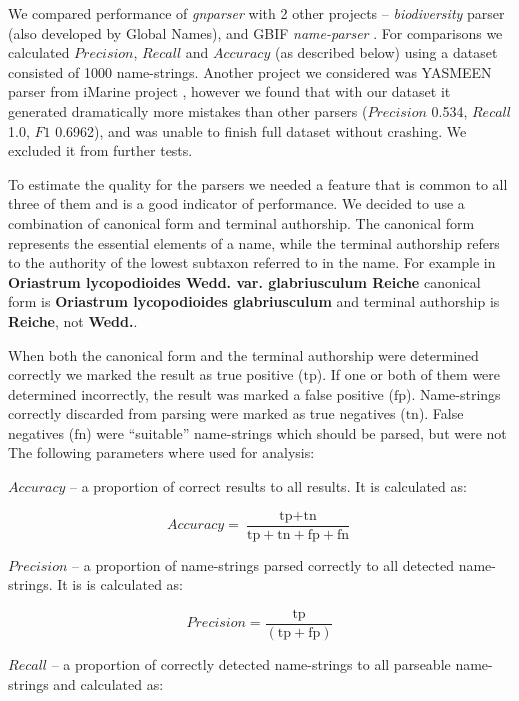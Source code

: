 \documentclass{bmcart}
\begin{document}
We compared performance of \textit{gnparser} with 2 other projects --
\textit{biodiversity} parser \cite{Boyle2013, biodiversity} (also developed by
Global Names), and GBIF \textit{name-parser} \cite{gbifNameParser}. For
comparisons we calculated $Precision$, $Recall$ and $Accuracy$ (as described
below) using a dataset consisted of 1000 name-strings. Another project we
considered was YASMEEN parser from iMarine project \cite{VandenBerghe2015},
however we found that with our dataset it generated dramatically more mistakes
than other parsers ($Precision$ 0.534, $Recall$ 1.0, $F1$ 0.6962), and was
unable to finish full dataset without crashing. We excluded it from further
tests.


To estimate the quality for the parsers we needed a feature that is common to
all three of them and is a good indicator of performance.  We decided to use a
combination of canonical form and terminal authorship.  The canonical form
represents the essential elements of a name, while the terminal authorship
refers to the authority of the lowest subtaxon  referred to in the name. For
example in \textbf{Oriastrum lycopodioides Wedd.  var.  glabriusculum Reiche}
canonical form is \textbf{Oriastrum lycopodioides glabriusculum} and terminal
authorship is \textbf{Reiche}, not \textbf{Wedd.}.

When both the canonical form and the terminal authorship were determined
correctly we marked the result as true positive ($\text{tp}$).  If one or both
of them were determined incorrectly, the result was marked a false positive
($\text{fp}$). Name-strings correctly discarded from parsing were marked as
true negatives ($\text{tn}$). False negatives ($\text{fn}$) were ``suitable''
name-strings which should be parsed, but were not The
following parameters where used for analysis:

$Accuracy$ -- a proportion of correct results to all results.  It is calculated
as:

\[Accuracy = \dfrac{\text{tp} + \text{tn}} {\text{tp} + \text{tn} + \text{fp} + \text{fn}}\]

$Precision$ -- a proportion of name-strings parsed correctly to all detected
name-strings. It is is calculated as:

\[Precision = \dfrac{\text{tp}}{(\text{tp} + \text{fp})}\]

$Recall$ -- a proportion of correctly detected name-strings to all parseable
name-strings and calculated as:
\end{document}
